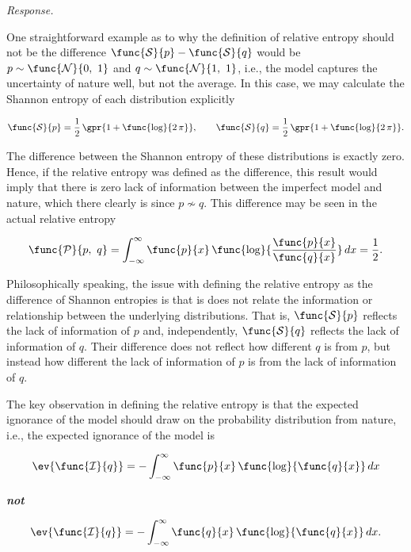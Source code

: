 \textit{Response.}

One straightforward example as to why the definition of relative entropy should not be the difference $\func{\mathcal{S}}{p} - \func{\mathcal{S}}{q}$ would be $p \sim \func{\mathcal{N}}{0,\ 1}$ and $q \sim \func{\mathcal{N}}{1,\ 1}$, i.e., the model captures the uncertainty of nature well, but not the average. In this case, we may calculate the Shannon entropy of each distribution explicitly

\begin{equation}
	\func{\mathcal{S}}{p} = \frac{1}{2}\,\gpr{1 + \func{\log}{2\,\pi}},\qquad \func{\mathcal{S}}{q} = \frac{1}{2}\,\gpr{1 + \func{\log}{2\,\pi}}.
\end{equation}

The difference between the Shannon entropy of these distributions is exactly zero. Hence, if the relative entropy was defined as the difference, this result would imply that there is zero lack of information between the imperfect model and nature, which there clearly is since $p \not\sim q$. This difference may be seen in the actual relative entropy

\begin{equation}
	\func{\mathcal{P}}{p,\ q} = \int_{-\infty}^{\infty} \func{p}{x}\,\func{\log}{\frac{\func{p}{x}}{\func{q}{x}}}\,dx = \frac{1}{2}.
\end{equation}

Philosophically speaking, the issue with defining the relative entropy as the difference of Shannon entropies is that is does not relate the information or relationship between the underlying distributions. That is, $\func{\mathcal{S}}{p}$ reflects the lack of information of $p$ and, independently, $\func{\mathcal{S}}{q}$ reflects the lack of information of $q$. Their difference does not reflect how different $q$ is from $p$, but instead how different the lack of information of $p$ is from the lack of information of $q$.

The key observation in defining the relative entropy is that the expected ignorance of the model should draw on the probability distribution from nature, i.e., the expected ignorance of the model is

\begin{equation}
	\ev{\func{\mathcal{I}}{q}} = -\int_{-\infty}^{\infty} \func{p}{x}\,\func{\log}{\func{q}{x}}\,dx
\end{equation}

\textbf{\textit{not}}

\begin{equation}
	\ev{\func{\mathcal{I}}{q}} = -\int_{-\infty}^{\infty} \func{q}{x}\,\func{\log}{\func{q}{x}}\,dx.
\end{equation}

